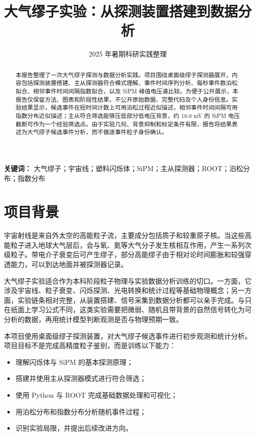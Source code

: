 \documentclass[11pt,a4paper]{ctexart}
\title{\textbf{大气缪子实验：从探测装置搭建到数据分析}}
\date{2025 年暑期科研实践整理}
\begin{document}
\maketitle
\thispagestyle{empty}

\begin{abstract}
本报告整理了一次大气缪子探测与数据分析实践。项目围绕桌面级缪子探测器展开，内容包括探测装置搭建、主从探测器符合模式理解、事件时间序列分析、每秒事件数泊松拟合、相邻事件时间间隔指数拟合，以及 SiPM 峰值电压谱比较。为便于公开展示，本报告仅保留方法、图表和阶段性结果，不公开原始数据、完整代码及个人身份信息。实验结果显示，候选事件在短时间计数上可用泊松过程近似描述，相邻事件时间间隔可用指数分布近似描述；主从符合筛选能够压低部分低电压背景，约 18.0 mV 的 SiPM 电压截断可作为一个经验筛选点。由于实验几何、背景抑制和标定条件有限，报告将结果表述为大气缪子候选事件分析，而不做逐事件粒子身份确认。
\end{abstract}

\vspace{0.8em}
\noindent\textbf{关键词：} 大气缪子；宇宙线；塑料闪烁体；SiPM；主从探测器；ROOT；泊松分布；指数分布

\newpage
\tableofcontents
\newpage

\section{项目背景}

宇宙射线是来自外太空的高能粒子流，主要成分包括质子和较重原子核。当这些高能粒子进入地球大气层后，会与氧、氮等大气分子发生核相互作用，产生一系列次级粒子。带电介子衰变后可产生缪子，部分高能缪子由于相对论时间膨胀和较强穿透能力，可以到达地面并被探测器记录。

大气缪子实验适合作为本科阶段粒子物理与实验数据分析训练的切口。一方面，它涉及宇宙线、粒子衰变、闪烁探测、光电转换和统计过程等基础物理概念；另一方面，实验链条相对完整，从装置搭建、信号采集到数据分析都可以亲手完成。与只在纸面上学习公式不同，这类实验需要把微弱、随机且带背景的自然信号转化为可分析的数据，再用统计模型判断观测是否与物理预期一致。

本项目使用桌面级缪子探测装置，对大气缪子候选事件进行初步观测和统计分析。项目目标不是完成高精度粒子鉴别，而是训练以下能力：

\begin{itemize}
  \item 理解闪烁体与 SiPM 的基本探测原理；
  \item 搭建并使用主从探测器模式进行符合筛选；
  \item 使用 Python 与 ROOT 完成基础数据处理和可视化；
  \item 用泊松分布和指数分布分析随机事件过程；
  \item 识别实验局限，并提出后续改进方向。
\end{itemize}
\end{document}
